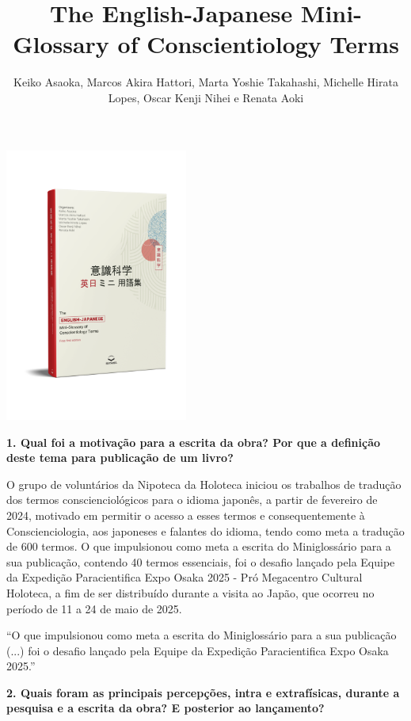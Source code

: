 \documentclass{gescons}
\author{Keiko Asaoka, Marcos Akira Hattori, Marta Yoshie Takahashi, Michelle Hirata Lopes, Oscar Kenji Nihei e Renata Aoki}
\title{The English-Japanese Mini-Glossary of Conscientiology Terms}
\begin{document}
    \makeentrevistatitle

    \begin{multicols}{2}

\begin{center}
    \vspace{-0.5cm}
    \includegraphics[width=6cm]{articles/entrevista/mockups/Mini-Glossary.png}
\end{center}


\textbf{1. Qual foi a motivação para a escrita da obra? Por que a definição deste tema para publicação de um livro?}

O grupo de voluntários da Nipoteca da Holoteca iniciou os trabalhos de tradução dos termos conscienciológicos para o idioma japonês, a partir de fevereiro de 2024, motivado em permitir o acesso a esses termos e consequentemente à Conscienciologia, aos japoneses e falantes do idioma, tendo como meta a tradução de 600 termos. O que impulsionou como meta a escrita do Miniglossário para a sua publicação, contendo 40 termos essenciais, foi o desafio lançado pela Equipe da Expedição Paracientifica Expo Osaka 2025 - Pró Megacentro Cultural Holoteca, a fim de ser distribuído durante a visita ao Japão, que ocorreu no período de 11 a 24 de maio de 2025.

\begin{pullquote}
    ``O que impulsionou como meta a escrita do Miniglossário para a sua publicação (...) foi o desafio lançado pela Equipe da Expedição Paracientifica Expo Osaka 2025.''
\end{pullquote}

\textbf{2. Quais foram as principais percepções, intra e extrafísicas, durante a pesquisa e a escrita da obra? E posterior ao lançamento?}



\end{multicols}
\end{document}
